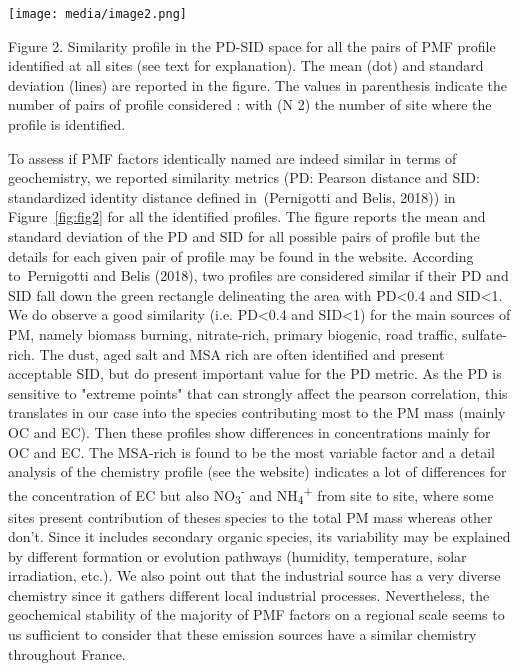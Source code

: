 \documentclass[
]{article}
\begin{document}
\texttt{[image: media/image2.png]}

Figure 2. Similarity profile in the PD-SID space for all the pairs of
PMF profile identified at all sites (see text for explanation). The mean
(dot) and standard deviation (lines) are reported in the figure. The
values in parenthesis indicate the number of pairs of profile considered
: with (N 2) the number of site where the profile is identified.

To assess if PMF factors identically named are indeed similar in terms
of geochemistry, we reported similarity metrics (PD: Pearson distance
and SID: standardized identity distance defined in~(Pernigotti and
Belis, 2018)) in Figure~\protect\hyperlink{fig:fig2}{{[}fig:fig2{]}} for
all the identified profiles. The figure reports the mean and standard
deviation of the PD and SID for all possible pairs of profile but the
details for each given pair of profile may be found in the website.
According to~Pernigotti and Belis (2018), two profiles are considered
similar if their PD and SID fall down the green rectangle delineating
the area with PD\textless0.4 and SID\textless1. We do observe a good
similarity (i.e. PD\textless0.4 and SID\textless1) for the main sources
of PM, namely biomass burning, nitrate-rich, primary biogenic, road
traffic, sulfate-rich. The dust, aged salt and MSA rich are often
identified and present acceptable SID, but do present important value
for the PD metric. As the PD is sensitive to "extreme points" that can
strongly affect the pearson correlation, this translates in our case
into the species contributing most to the PM mass (mainly OC and EC).
Then these profiles show differences in concentrations mainly for OC and
EC. The MSA-rich is found to be the most variable factor and a detail
analysis of the chemistry profile (see the website) indicates a lot of
differences for the concentration of EC but also
NO\textsubscript{3}\textsuperscript{-} and
NH\textsubscript{4}\textsuperscript{+} from site to site, where some
sites present contribution of theses species to the total PM mass
whereas other don't. Since it includes secondary organic species, its
variability may be explained by different formation or evolution
pathways (humidity, temperature, solar irradiation, etc.). We also point
out that the industrial source has a very diverse chemistry since it
gathers different local industrial processes. Nevertheless, the
geochemical stability of the majority of PMF factors on a regional scale
seems to us sufficient to consider that these emission sources have a
similar chemistry throughout France.
\end{document}
